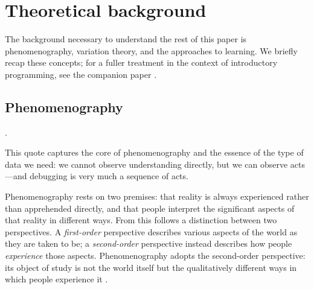 \mode*
\section{Theoretical background}
\label{background}

The background necessary to understand the rest of this paper is
phenomenography, variation theory, and the approaches to learning.
We briefly recap these concepts; for a fuller treatment in the context of
introductory programming, see the companion paper
\autocite{VTProgMisconceptions}.

\subsection{Phenomenography}

\begin{frame}
  .
\end{frame}
This quote captures the core of phenomenography and the essence of the type of
data we need: we cannot observe understanding directly, but we can observe
acts---and debugging is very much a sequence of acts.

Phenomenography rests on two premises: that reality is always experienced
rather than apprehended directly, and that people interpret the significant
aspects of that reality in different ways. From this follows a distinction
between two perspectives. A \emph{first-order} perspective describes various
aspects of the world as they are taken to be; a \emph{second-order} perspective
instead describes how people \emph{experience} those aspects. Phenomenography
adopts the second-order perspective: its object of study is not the world itself
but the qualitatively different ways in which people experience it
\autocite{Phenomenography}.


